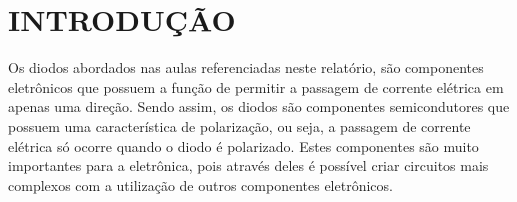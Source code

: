 \chapter{INTRODUÇÃO}

Os diodos abordados nas aulas referenciadas neste relatório, são componentes eletrônicos que possuem a função de permitir a passagem de corrente elétrica em apenas uma direção. Sendo assim, os diodos são componentes semicondutores que possuem uma característica de polarização, ou seja, a passagem de corrente elétrica só ocorre quando o diodo é polarizado. Estes componentes são muito importantes para a eletrônica, pois através deles é possível criar circuitos mais complexos com a utilização de outros componentes eletrônicos.